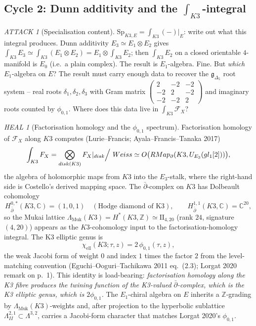 \documentclass[11pt]{amsart}
\providecommand{\C}{\mathbb{C}}
\providecommand{\Z}{\mathbb{Z}}
\providecommand{\cO}{\mathcal{O}}
\providecommand{\cF}{\mathcal{F}}
\providecommand{\gDelta}{\mathfrak{g}_{\Delta_5}}
\providecommand{\Lat}{\Lambda}
\providecommand{\dbar}{\bar{\partial}}
\providecommand{\Sp}{\mathrm{Sp}}
\theoremstyle{plain}
\theoremstyle{definition}
\theoremstyle{remark}
\newtheorem*{attack}{ATTACK}
\newtheorem*{heal}{HEAL}
\begin{document}
\subsection{Cycle 2: Dunn additivity and the $\int_{K3}$-integral}

\begin{attack}[Specialisation content]
$\Sp_{K3,E}=\int_{K3}(-)|_E$: write out what this integral produces. Dunn
additivity $E_3\simeq E_1\otimes E_2$ gives $\int_{K3}E_3\simeq
\int_{K3}(E_1\otimes E_2)=E_1\otimes\int_{K3}E_2$; then $\int_{K3}E_2$ on
a closed orientable $4$-manifold is $E_0$ (i.e.\ a plain complex). The
result is $E_1$-algebra. Fine. But \emph{which} $E_1$-algebra on $E$? The
result must carry enough data to recover the $\gDelta$ root system --
real roots $\delta_1,\delta_2,\delta_3$ with Gram matrix $\begin{pmatrix}
2&-2&-2\\-2&2&-2\\-2&-2&2\end{pmatrix}$ and imaginary roots counted by
$\phi_{0,1}$. Where does this data live in $\int_{K3}\cF_X$?
\end{attack}

\begin{heal}[Factorisation homology and the $\phi_{0,1}$ spectrum]
\label{heal:stage2}
Factorisation homology of $\cF_X$ along $K3$ computes (Lurie--Francis;
Ayala--Francis--Tanaka 2017)
\[
\int_{K3}\cF_X = \bigotimes_{\mathrm{disk}(K3)}\cF_X|_{\mathrm{disk}}
\Big/\ \mathrm{Weiss}
\simeq \cO\bigl(\mathrm{RMap}_{\dbar}(K3,U_{E_3}(\fgl_1[2]))\bigr),
\]
the algebra of holomorphic maps from $K3$ into the $E_3$-stalk, where
the right-hand side is Costello's derived mapping space. The
$\dbar$-complex on $K3$ has Dolbeault cohomology
\[
H^{0,\ast}_{\dbar}(K3,\C) = (1,0,1) \quad(\text{Hodge diamond of K3}),
\qquad
H^{1,1}_{\dbar}(K3,\C)=\C^{20},
\]
so the Mukai lattice $\Lat_{\mathrm{Muk}}(K3)=H^\ast(K3,\Z)\simeq
\mathrm{II}_{4,20}$ (rank $24$, signature $(4,20)$) appears as the
$K3$-cohomology input to the factorisation-homology integral. The K3
elliptic genus is
\[
\chi_{\mathrm{ell}}(K3;\tau,z) = 2\,\phi_{0,1}(\tau,z),
\]
the weak Jacobi form of weight $0$ and index $1$ times the factor $2$
from the level-matching convention (Eguchi--Ooguri--Tachikawa 2011
eq.~(2.3); Lorgat 2020 remark on p.~1). This identity is load-bearing:
\emph{factorisation homology along the K3 fibre produces the twining
function of the K3-valued $\dbar$-complex, which is the K3 elliptic
genus, which is $2\phi_{0,1}$.} The $E_1$-chiral algebra on $E$ inherits
a $\Z$-grading by $\Lat_{\mathrm{Muk}}(K3)$-weights and, after projection
to the hyperbolic sublattice $\Lat^{2,1}_{II}\subset \Lat^{3,2}$, carries
a Jacobi-form character that matches Lorgat 2020's $\phi_{0,1}$.
\end{heal}
\end{document}
